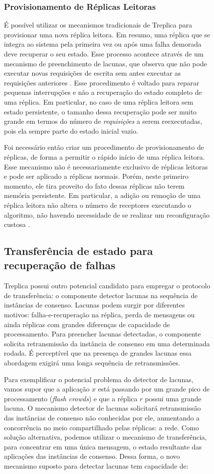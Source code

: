 \begin{figure}[ht]
\subsubsection{Provisionamento de Réplicas Leitoras}

É possível utilizar os mecanismos tradicionais de Treplica para provisionar uma nova
réplica leitora. Em resumo, uma réplica que se integra ao sistema pela primeira vez ou
após uma falha demorada deve recuperar o seu estado. Esse processo acontece através de um
mecanismo de preenchimento de lacunas, que observa que não pode executar novas requisições
de escrita sem antes executar as requisições anteriores \cite{vieira-tr10b}. Esse
procedimento é voltado para reparar pequenas interrupções e não a recuperação do estado
completo de uma réplica. Em particular, no caso de uma réplica leitora sem estado
persistente, o tamanho dessa recuperação pode ser muito grande em termos do número de
\emph{requisições} a serem reexecutadas, pois ela sempre parte do estado inicial vazio.

Foi necessário então criar um procedimento de provisionamento de réplicas, de forma a
permitir o rápido início de uma réplica leitora. Esse mecanismo não é necessariamente
exclusivo de réplicas leitoras e pode ser aplicado a réplicas normais. Porém, neste
primeiro momento, ele tira proveito do fato dessas réplicas não terem memória persistente.
Em particular, a adição ou remoção de uma réplica leitora não altera o número de
receptores executando o algoritmo, não havendo necessidade de se realizar um
reconfiguração custosa \cite{lamport10}.

\subsection{Transferência de estado para recuperação de falhas}

Treplica possui outro potencial candidato para empregar o protocolo de transferência: o
componente detector lacunas na sequência de instâncias de consenso. Lacunas podem surgir
por diferentes motivos: falha-e-recuperação na réplica, perda de mensagens ou ainda
réplicas com grandes diferenças de capacidade de processamento. Para preencher lacunas
detectadas, o componente solicita retransmissão da instância de consenso em uma
determinada rodada. É perceptível que na presença de grandes lacunas essa abordagem
exigirá uma longa sequência de retransmissões.

Para exemplificar o potencial problema do detector de lacunas, vamos supor que a aplicação
$x$ está passando por um grande pico de processamento (\emph{flash crowds}) e que a
réplica $r$ possui uma grande lacuna. O mecanismo detector de lacunas solicitará
retransmissão das instâncias de consenso não conhecidas por ele, aumentando a concorrência
no meio compartilhado pelas réplicas: a rede. Como solução alternativa, podemos utilizar o
mecanismo de transferência, para concentrar em uma única mensagem, o estado resultante das
aplicações das instâncias de consenso. Dessa forma, o novo mecanismo suposto para detectar
lacunas tem capacidade de:


\end{figure}
